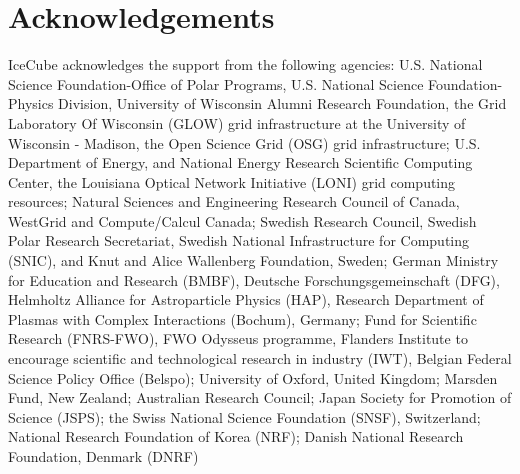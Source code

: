 \documentclass[12pt]{elsarticle}
\begin{document}
\thispagestyle{empty}





\tableofcontents
\clearpage

\resetlinenumber

\clearpage


\resetlinenumber

\clearpage


\resetlinenumber

\clearpage

\resetlinenumber

\clearpage

\resetlinenumber

\clearpage

\resetlinenumber

\clearpage


\resetlinenumber

\clearpage

\resetlinenumber

\clearpage

\resetlinenumber

\clearpage

\resetlinenumber

\clearpage

\resetlinenumber

\clearpage

%
%
\resetlinenumber
\section{Acknowledgements}

IceCube acknowledges the support from the following agencies: U.S. National
Science Foundation-Office of Polar Programs, U.S. National Science
Foundation-Physics Division, University of Wisconsin Alumni Research
Foundation, the Grid Laboratory Of Wisconsin (GLOW) grid
infrastructure at the University of Wisconsin - Madison, the Open
Science Grid (OSG) grid infrastructure; U.S. Department of Energy, and
National Energy Research Scientific Computing Center, the Louisiana
Optical Network Initiative (LONI) grid computing resources; Natural
Sciences and Engineering Research Council of Canada, WestGrid and
Compute/Calcul Canada; Swedish Research Council, Swedish Polar
Research Secretariat, Swedish National Infrastructure for Computing
(SNIC), and Knut and Alice Wallenberg Foundation, Sweden; German
Ministry for Education and Research (BMBF), Deutsche
Forschungsgemeinschaft (DFG), Helmholtz Alliance for Astroparticle
Physics (HAP), Research Department of Plasmas with Complex
Interactions (Bochum), Germany; Fund for Scientific Research
(FNRS-FWO), FWO Odysseus programme, Flanders Institute to encourage
scientific and technological research in industry (IWT), Belgian
Federal Science Policy Office (Belspo); University of Oxford, United
Kingdom; Marsden Fund, New Zealand; Australian Research Council; Japan
Society for Promotion of Science (JSPS); the Swiss National Science
Foundation (SNSF), Switzerland; National Research Foundation of Korea
(NRF); Danish National Research Foundation, Denmark (DNRF)

%

%


\clearpage

%
%

\resetlinenumber
  
\end{document}
